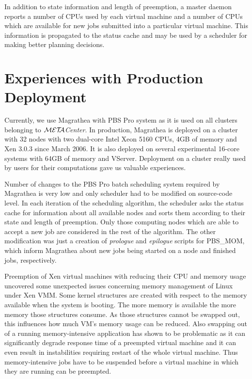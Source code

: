 \documentclass{sigplanconf}
\def\META#1{\textit{${\cal MET\!\!A}$#1}}
\begin{document}
In addition to state information and length of preemption, a master daemon
reports a number of CPUs used by each virtual machine and a number of CPUs
which are available for new jobs submitted into a particular virtual machine.
This information is propagated to the status cache and may be used by a
scheduler for making better planning decisions.

\section{Experiences with Production Deployment}
\label{sec:deployment}

Currently, we use Magrathea with PBS Pro system as it is used on all clusters
belonging to \META{Center}. In production, Magrathea is deployed on a cluster
with 32 nodes with two dual-core Intel Xeon 5160 CPUs, 4GB of memory and Xen
3.0.3 since March 2006. It is also deployed on several experimental 16-core
systems with 64GB of memory and VServer. Deployment on a cluster really used
by users for their computations gave us valuable experiences.

Number of changes to the PBS Pro batch scheduling system required by Magrathea
is very low and only scheduler had to be modified on source-code level. In
each iteration of the scheduling algorithm, the scheduler asks the status
cache for information about all available nodes and sorts them according to
their state and length of preemption. Only those computing nodes which are
able to accept a new job are considered in the rest of the algorithm. The
other modification was just a creation of \textit{prologue} and
\textit{epilogue} scripts for PBS\_MOM, which inform Magrathea about new jobs
being started on a node and finished jobs, respectively.

Preemption of Xen virtual machines with reducing their CPU and memory usage
uncovered some unexpected issues concerning memory management of Linux under
Xen VMM. Some kernel structures are created with respect to the memory
available when the system is booting. The more memory is available the more
memory those structures consume. As those structures cannot be swapped out,
this influences how much VM's memory usage can be reduced. Also swapping out
of a running memory-intensive application has shown to be problematic as it
can significantly degrade response time of a preempted virtual machine and it
can even result in instabilities requiring restart of the whole virtual
machine. Thus memory-intensive jobs have to be suspended before a virtual
machine in which they are running can be preempted.
\end{document}
